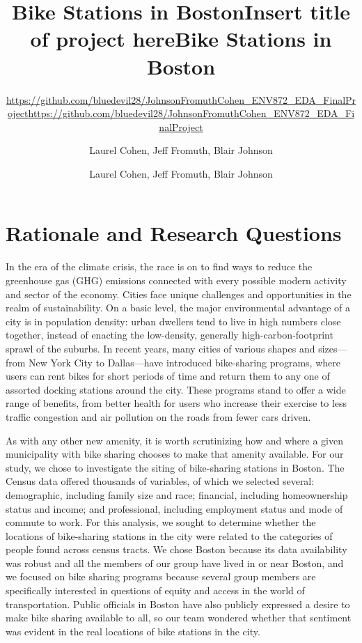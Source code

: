 \documentclass[
  12pt,
]{article}
\title{Bike Stations in Boston}
\title{Insert title of project here}
\subtitle{\url{https://github.com/bluedevil28/JohnsonFromuthCohen_ENV872_EDA_FinalProject}}
\author{Laurel Cohen, Jeff Fromuth, Blair Johnson}
\date{}
\title{Bike Stations in Boston}
\subtitle{\url{https://github.com/bluedevil28/JohnsonFromuthCohen_ENV872_EDA_FinalProject}}
\author{Laurel Cohen, Jeff Fromuth, Blair Johnson}
\date{}
\begin{document}
\maketitle

\newpage

\hypertarget{rationale-and-research-questions}{%
\section{Rationale and Research
Questions}\label{rationale-and-research-questions}}

In the era of the climate crisis, the race is on to find ways to reduce
the greenhouse gas (GHG) emissions connected with every possible modern
activity and sector of the economy. Cities face unique challenges and
opportunities in the realm of sustainability. On a basic level, the
major environmental advantage of a city is in population density: urban
dwellers tend to live in high numbers close together, instead of
enacting the low-density, generally high-carbon-footprint sprawl of the
suburbs. In recent years, many cities of various shapes and sizes---from
New York City to Dallas---have introduced bike-sharing programs, where
users can rent bikes for short periods of time and return them to any
one of assorted docking stations around the city. These programs stand
to offer a wide range of benefits, from better health for users who
increase their exercise to less traffic congestion and air pollution on
the roads from fewer cars driven.

As with any other new amenity, it is worth scrutinizing how and where a
given municipality with bike sharing chooses to make that amenity
available. For our study, we chose to investigate the siting of
bike-sharing stations in Boston. The Census data offered thousands of
variables, of which we selected several: demographic, including family
size and race; financial, including homeownership status and income; and
professional, including employment status and mode of commute to work.
For this analysis, we sought to determine whether the locations of
bike-sharing stations in the city were related to the categories of
people found across census tracts. We chose Boston because its data
availability was robust and all the members of our group have lived in
or near Boston, and we focused on bike sharing programs because several
group members are specifically interested in questions of equity and
access in the world of transportation. Public officials in Boston have
also publicly expressed a desire to make bike sharing available to all,
so our team wondered whether that sentiment was evident in the real
locations of bike stations in the city.
\end{document}
